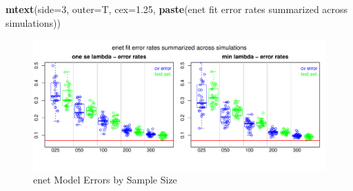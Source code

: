 \documentclass[
]{book}
\newenvironment{Shaded}{\begin{snugshade}}{\end{snugshade}}
\newcommand{\DataTypeTok}[1]{\textcolor[rgb]{0.13,0.29,0.53}{#1}}
\newcommand{\DecValTok}[1]{\textcolor[rgb]{0.00,0.00,0.81}{#1}}
\newcommand{\FloatTok}[1]{\textcolor[rgb]{0.00,0.00,0.81}{#1}}
\newcommand{\KeywordTok}[1]{\textcolor[rgb]{0.13,0.29,0.53}{\textbf{#1}}}
\newcommand{\NormalTok}[1]{#1}
\newcommand{\StringTok}[1]{\textcolor[rgb]{0.31,0.60,0.02}{#1}}
\begin{document}
\begin{Shaded}
\begin{Highlighting}[]
\KeywordTok{mtext}\NormalTok{(}\DataTypeTok{side=}\DecValTok{3}\NormalTok{, }\DataTypeTok{outer=}\NormalTok{T, }\DataTypeTok{cex=}\FloatTok{1.25}\NormalTok{, }\KeywordTok{paste}\NormalTok{(}\StringTok{\textquotesingle{}enet fit error rates summarized across simulations\textquotesingle{}}\NormalTok{))}
\end{Highlighting}
\end{Shaded}

\begin{figure}
\centering
\includegraphics{Static/figures/enet-simRes-errors-overSim-1.pdf}
\caption{\label{fig:enet-simRes-errors-overSim}enet Model Errors by Sample Size}
\end{figure}
\end{document}
